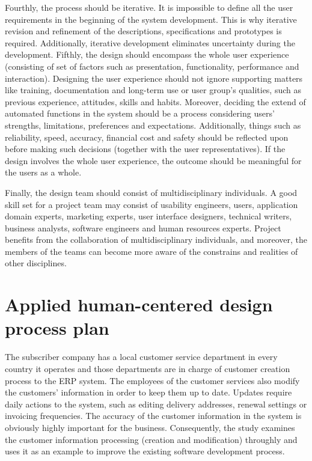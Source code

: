 \documentclass[12pt,a4paper,oneside,pdftex]{report}
\begin{document}
Fourthly, the process should be iterative. It is impossible to define all the user requirements in the beginning of the system development. This is why iterative revision and refinement of the descriptions, specifications and prototypes is required. Additionally, iterative development eliminates uncertainty during the development. Fifthly, the design should encompass the whole user experience (consisting of set of factors such as presentation, functionality, performance and interaction). Designing the user experience should not ignore supporting matters like training, documentation and long-term use or user group's qualities, such as previous experience, attitudes, skills and habits. Moreover, deciding the extend of automated functions in the system should be a process considering users' strengths, limitations, preferences and expectations. Additionally, things such as reliability, speed, accuracy, financial cost and safety should be reflected upon before making such decisions (together with the user representatives). If the design involves the whole user experience, the outcome should be meaningful for the users as a whole. \citep{RefWorks:40}

Finally, the design team should consist of multidisciplinary individuals. A good skill set for a project team may consist of usability engineers, users, application domain experts, marketing experts, user interface designers, technical writers, business analysts, software engineers and human resources experts. Project benefits from the collaboration of multidisciplinary individuals, and moreover, the members of the teams can become more aware of the constrains and realities of other disciplines. \citep{RefWorks:40}

\section{Applied human-centered design process plan}
\label{sec:dprocess}

The subscriber company has a local customer service department in every country it operates and those departments are in charge of customer creation process to the ERP system. The employees of the customer services also modify the customers' information in order to keep them up to date. Updates require daily actions to the system, such as editing delivery addresses, renewal settings or invoicing frequencies. The accuracy of the customer information in the system is obviously highly important for the business. Consequently, the study examines the customer information processing (creation and modification) throughly and uses it as an example to improve the existing software development process.
\end{document}
